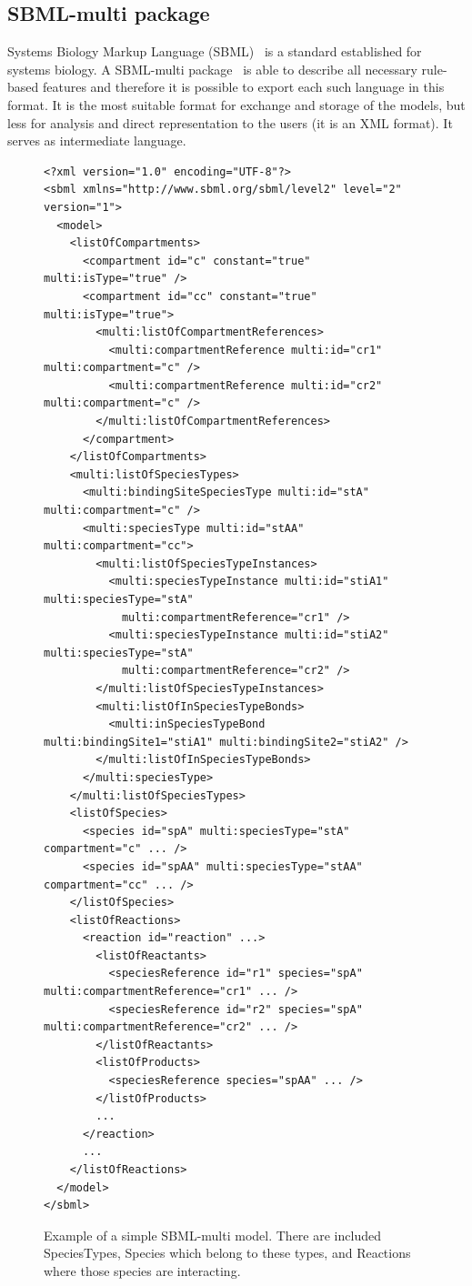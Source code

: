 \documentclass[12pt]{fithesis2}
\begin{document}
\subsection{SBML-multi package}

Systems Biology Markup Language (SBML)~\cite{hucka2003systems} is a standard established for systems biology. A SBML-multi package~\cite{zhang2015sbml} is able to describe all necessary rule-based features and therefore it is possible to export each such language in this format. It is the most suitable format for exchange and storage of the models, but less for analysis and direct representation to the users (it is an XML format). It serves as intermediate language.

\begin{figure}[!h]
\lstset{language=XML}
\begin{lstlisting}[basicstyle=\tiny, frame=single]
<?xml version="1.0" encoding="UTF-8"?>
<sbml xmlns="http://www.sbml.org/sbml/level2" level="2" version="1">
  <model>
    <listOfCompartments>
      <compartment id="c" constant="true" multi:isType="true" />
      <compartment id="cc" constant="true" multi:isType="true">
        <multi:listOfCompartmentReferences>
          <multi:compartmentReference multi:id="cr1" multi:compartment="c" />
          <multi:compartmentReference multi:id="cr2" multi:compartment="c" />
        </multi:listOfCompartmentReferences>
      </compartment>
    </listOfCompartments>
    <multi:listOfSpeciesTypes>
      <multi:bindingSiteSpeciesType multi:id="stA" multi:compartment="c" />
      <multi:speciesType multi:id="stAA" multi:compartment="cc">
        <multi:listOfSpeciesTypeInstances>
          <multi:speciesTypeInstance multi:id="stiA1" multi:speciesType="stA"
            multi:compartmentReference="cr1" />
          <multi:speciesTypeInstance multi:id="stiA2" multi:speciesType="stA"
            multi:compartmentReference="cr2" />
        </multi:listOfSpeciesTypeInstances>
        <multi:listOfInSpeciesTypeBonds>
          <multi:inSpeciesTypeBond multi:bindingSite1="stiA1" multi:bindingSite2="stiA2" />
        </multi:listOfInSpeciesTypeBonds>
      </multi:speciesType>
    </multi:listOfSpeciesTypes>
    <listOfSpecies>
      <species id="spA" multi:speciesType="stA" compartment="c" ... />
      <species id="spAA" multi:speciesType="stAA" compartment="cc" ... />
    </listOfSpecies>
    <listOfReactions>
      <reaction id="reaction" ...>
        <listOfReactants>
          <speciesReference id="r1" species="spA" multi:compartmentReference="cr1" ... />
          <speciesReference id="r2" species="spA" multi:compartmentReference="cr2" ... />
        </listOfReactants>
        <listOfProducts>
          <speciesReference species="spAA" ... />
        </listOfProducts>
        ...
      </reaction>
      ...
    </listOfReactions>
  </model>
</sbml>
\end{lstlisting}
\caption{Example of a simple SBML-multi model. There are included SpeciesTypes, Species which belong to these types, and Reactions where those species are interacting.}\label{SBML_example}
\end{figure}
\end{document}
